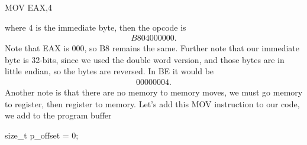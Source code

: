 \documentclass{report}
\begin{document}
\begin{itemize}
            \bigbreak \noindent 
            \begin{cppcode}
                MOV    EAX,4
            \end{cppcode}
            \bigbreak \noindent 
            where 4 is the immediate byte, then the opcode is
            \begin{align*}
                B804000000
            .\end{align*}
            Note that EAX is 000, so B8 remains the same. Further note that our immediate byte is 32-bits, since we used the double word version, and those bytes are in little endian, so the bytes are reversed. In BE it would be
            \begin{align*}
                00000004
            .\end{align*}
            Another note is that there are no memory to memory moves, we must go memory to register, then register to memory. 
            \bigbreak \noindent 
            Let's add this MOV instruction to our code, we add to the program buffer
            \bigbreak \noindent 
            \begin{cppcode}
            size_t p_offset = 0;


\end{cppcode}
\end{itemize}
\end{document}
